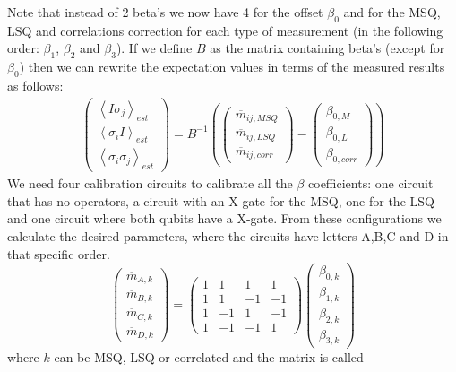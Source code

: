 Note that instead of 2 beta's we now have 4 for the offset
$\beta_0$ and for the MSQ, LSQ and correlations correction for each type of
measurement (in the following order: $\beta_1$, $\beta_2$ and $\beta_3$). If we
define $B$ as the matrix containing beta's (except for $\beta_0$) then we can
rewrite the expectation values in terms of the measured results as follows:
\begin{equation}
\begin{split}
\begin{pmatrix} \left\langle I\sigma_j\right\rangle_{est} \\ \left\langle
\sigma_iI\right\rangle_{est} \\ \left\langle \sigma_i\sigma_j\right\rangle_{est}
\end{pmatrix}=B^{-1}\left(\begin{pmatrix} \overline{m}_{ij,MSQ} \\
\overline{m}_{ij,LSQ} \\ \overline{m}_{ij,corr}
\end{pmatrix}-\begin{pmatrix} \beta_{0,M} \\ \beta_{0,L} \\ \beta_{0,corr}
\end{pmatrix}\right)
\end{split}
\end{equation} We need four calibration circuits to calibrate all the $\beta$
coefficients: one circuit that has no operators, a circuit with an X-gate for
the MSQ, one for the LSQ and one circuit where both qubits have a X-gate. From
these configurations we calculate the desired parameters, where the circuits
have letters A,B,C and D in that specific order.
\begin{equation}
\begin{pmatrix} \overline{m}_{A,k} \\ \overline{m}_{B,k} \\ \overline{m}_{C,k}
\\ \overline{m}_{D,k}
\end{pmatrix}=\begin{pmatrix} 1&1&1&1\\ 1&1&-1&-1\\ 1&-1&1&-1\\ 1&-1&-1&1
\end{pmatrix}\begin{pmatrix} \beta_{0,k} \\ \beta_{1,k} \\ \beta_{2,k} \\
\beta_{3,k}
\end{pmatrix}
\end{equation} where $k$ can be MSQ, LSQ or correlated and the matrix is called
